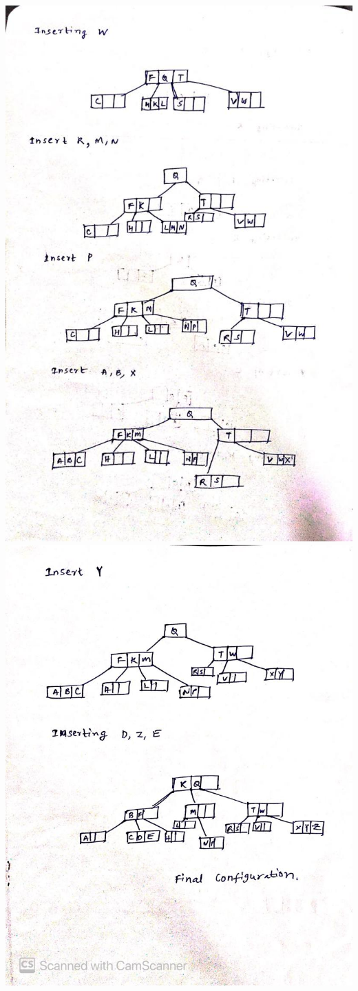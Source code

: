 \documentclass[11pt]{article}
\begin{document}
\includegraphics[scale = 0.4]{WhatsApp Image 2020-04-06 at 3.14.48 AM.jpeg}
\includegraphics[scale = 0.4]{WhatsApp Image 2020-04-06 at 3.15.02 AM.jpeg}
\end{document}
